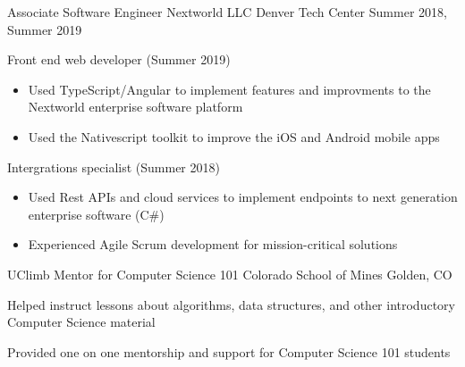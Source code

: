 

\begin{cventries}

  \cventry
    {Associate Software Engineer} %
    {Nextworld LLC} %
    {Denver Tech Center} %
    {Summer 2018, Summer 2019} %
    {
      \begin{cvitems} %
      \item {Front end web developer (Summer 2019)}
      \begin{itemize}
            \item {Used TypeScript/Angular to implement features and
    improvments to the Nextworld enterprise software platform}
        \item {Used the Nativescript toolkit to improve the iOS and
    Android mobile apps}
    \end{itemize}
        \item {Intergrations specialist (Summer 2018)}
        \begin{itemize}
                \item {Used Rest APIs and cloud services to implement
                            endpoints to next generation enterprise software (C\#)}
                                    \item {Experienced Agile Scrum
    development for mission-critical solutions}
    \end{itemize}
      \end{cvitems}
    }
    
    \cventry
    	{UClimb Mentor for Computer Science 101}
    	{ Colorado School of Mines }
    	{ Golden, CO}
   	 { }
   	 {
   	 \begin{cvitems}
   	 \item {Helped instruct lessons about algorithms, data structures, and other introductory Computer Science material}
   	 \item {Provided one on one mentorship and support for Computer Science 101 students}
    \end{cvitems}
    }
    

\end{cventries}

